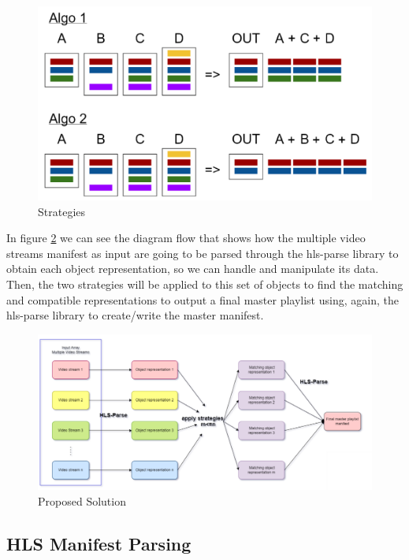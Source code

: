  
\begin{figure}[!ht]

\centering
\includegraphics[scale=0.70]{figures/strategies.png}
\caption{Strategies}
\label{fig:strategies}
\end{figure}

In figure \ref{fig:proposal} we can see the diagram flow that shows how the multiple video streams manifest as input are going to be parsed through the hls-parse library to obtain each object representation, so we can handle and manipulate its data. Then, the two strategies will be applied to this set of objects to find the matching and compatible representations to output a final master playlist using, again, the hls-parse library to create/write the master manifest.

\begin{figure}[!ht]

\centering
\includegraphics[scale=0.31]{figures/proposal.png}
\caption{Proposed Solution}
\label{fig:proposal}
\end{figure}

\subsection{HLS Manifest Parsing}

